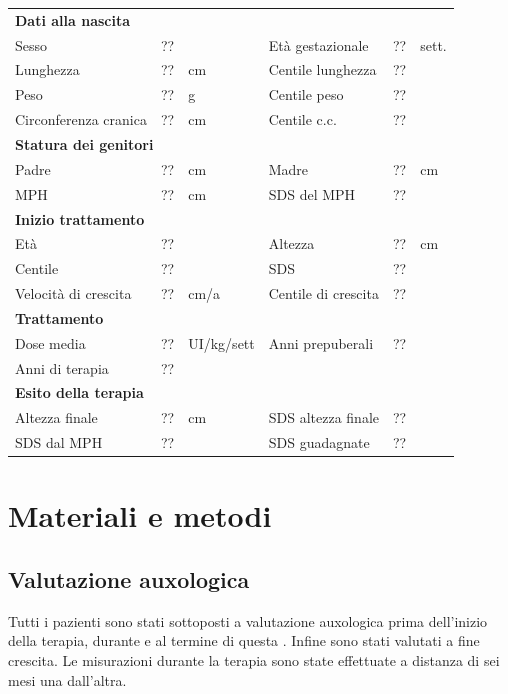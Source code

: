 \begin{table}[!h]
\begin{tabular}{lrllrl}
\toprule
\multicolumn{6}{l}{\textbf{Dati alla nascita}}\\
Sesso 		& \multicolumn{2}{l}{??} 	& Età gestazionale 		& ?? 		& sett.\\
Lunghezza 	& ?? 		& cm 				& Centile lunghezza		& ?? 		\\
Peso 		& ?? 		& g					& Centile peso			& ?? 		\\
Circonferenza cranica	& ?? 		& cm 	& Centile c.c.			& ?? \\
\midrule
\multicolumn{6}{l}{\textbf{Statura dei genitori}}\\
Padre 		& ?? & cm 	& Madre 				& ?? & cm \\
MPH 		& ?? & cm 	& SDS del MPH 			& ??\\
\midrule
\multicolumn{6}{l}{\textbf{Inizio trattamento}} \\
Età	& ?? & 		& Altezza 				& ?? & cm  \\
Centile & ?? 	 &		& SDS		& ?? \\
Velocità di crescita & ?? & cm/a	& Centile di crescita & ??\\
\midrule
\multicolumn{6}{l}{\textbf{Trattamento}} \\
Dose media		& ?? & UI/kg/sett & Anni prepuberali & ??\\
Anni di terapia & ??\\
\midrule
\multicolumn{6}{l}{\textbf{Esito della terapia}} \\
Altezza finale			& ?? & cm 	& SDS altezza finale		& ??\\
SDS dal MPH				& ?? &		& SDS guadagnate 			& ??\\
\bottomrule
\end{tabular}
\end{table}
\clearpage


\section{Materiali e metodi}

\subsection{Valutazione auxologica}
Tutti i pazienti sono stati sottoposti a valutazione auxologica prima dell'inizio della terapia, durante e al termine di questa . Infine sono stati valutati a fine crescita. Le misurazioni durante la terapia sono state effettuate a distanza di sei mesi una dall'altra.

